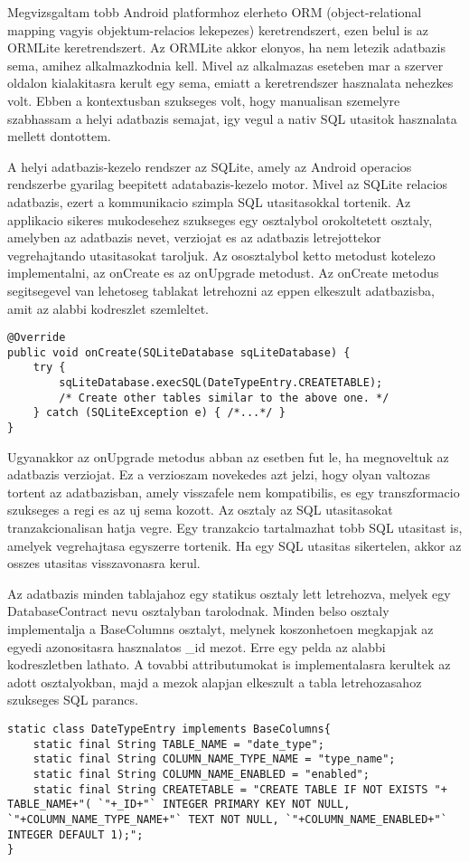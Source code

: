 Megvizsgaltam tobb Android platformhoz elerheto ORM (object-relational mapping vagyis objektum-relacios lekepezes) keretrendszert, ezen belul is az ORMLite keretrendszert. 
Az ORMLite akkor elonyos, ha nem letezik adatbazis sema, amihez alkalmazkodnia kell.
Mivel az alkalmazas eseteben mar a szerver oldalon kialakitasra kerult egy sema, emiatt a keretrendszer hasznalata nehezkes volt.
Ebben a kontextusban szukseges volt, hogy manualisan szemelyre szabhassam a helyi adatbazis semajat, igy vegul a nativ SQL utasitok hasznalata mellett dontottem.

A helyi adatbazis-kezelo rendszer az SQLite, amely az Android operacios rendszerbe gyarilag beepitett adatabazis-kezelo motor.
Mivel az SQLite relacios adatbazis, ezert a kommunikacio szimpla SQL utasitasokkal tortenik.
Az applikacio sikeres mukodesehez szukseges egy  osztalybol orokoltetett osztaly, amelyben az adatbazis nevet, verziojat es az adatbazis letrejottekor vegrehajtando utasitasokat taroljuk.
Az ososztalybol ketto metodust kotelezo implementalni, az onCreate es az onUpgrade metodust.
Az onCreate metodus segitsegevel van lehetoseg tablakat letrehozni az eppen elkeszult adatbazisba, amit az alabbi kodreszlet szemleltet.
\begin{lstlisting}
@Override
public void onCreate(SQLiteDatabase sqLiteDatabase) {
	try {
		sqLiteDatabase.execSQL(DateTypeEntry.CREATETABLE);
		/* Create other tables similar to the above one. */
	} catch (SQLiteException e) { /*...*/ }
}
\end{lstlisting}
Ugyanakkor az onUpgrade metodus abban az esetben fut le, ha megnoveltuk az adatbazis verziojat.
Ez a verzioszam novekedes azt jelzi, hogy olyan valtozas tortent az adatbazisban, amely visszafele nem kompatibilis, es egy transzformacio szukseges a regi es az uj sema kozott.
Az  osztaly az SQL utasitasokat tranzakcionalisan hatja vegre.
Egy tranzakcio tartalmazhat tobb SQL utasitast is, amelyek vegrehajtasa egyszerre tortenik.
Ha egy SQL utasitas sikertelen, akkor az osszes utasitas visszavonasra kerul.

Az adatbazis minden tablajahoz egy statikus osztaly lett letrehozva, melyek egy DatabaseContract nevu osztalyban tarolodnak.
Minden belso osztaly implementalja a BaseColumns osztalyt, melynek koszonhetoen megkapjak az egyedi azonositasra hasznalatos  \_id mezot.
Erre egy pelda az alabbi kodreszletben lathato.
A tovabbi attributumokat is implementalasra kerultek az adott osztalyokban, majd a mezok alapjan elkeszult a tabla letrehozasahoz szukseges SQL parancs.
\begin{lstlisting}
static class DateTypeEntry implements BaseColumns{
	static final String TABLE_NAME = "date_type";
	static final String COLUMN_NAME_TYPE_NAME = "type_name";
	static final String COLUMN_NAME_ENABLED = "enabled";
	static final String CREATETABLE = "CREATE TABLE IF NOT EXISTS "+ TABLE_NAME+"( `"+_ID+"` INTEGER PRIMARY KEY NOT NULL, `"+COLUMN_NAME_TYPE_NAME+"` TEXT NOT NULL, `"+COLUMN_NAME_ENABLED+"` INTEGER DEFAULT 1);";
}
\end{lstlisting}

